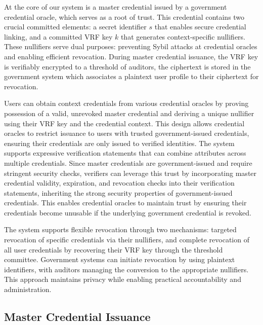 \noindent At the core of our system is a master credential issued by a government credential oracle, which serves as a root of trust. This credential contains two crucial committed elements: a secret identifier $s$ that enables secure credential linking, and a committed VRF key $k$ that generates context-specific nullifiers. These nullifiers serve dual purposes: preventing Sybil attacks at credential oracles and enabling efficient revocation. During master credential issuance, the VRF key is verifiably encrypted to a threshold of auditors, the ciphertext is stored in the government system which associates a plaintext user profile to their ciphertext for revocation.


\noindent Users can obtain context credentials from various credential oracles by proving possession of a valid, unrevoked master credential and deriving a unique nullifier using their VRF key and the credential context. This design allows credential oracles to restrict issuance to users with trusted government-issued credentials, ensuring their credentials are only issued to verified identities. The system supports expressive verification statements that can combine attributes across multiple credentials. Since master credentials are government-issued and require stringent security checks, verifiers can leverage this trust by incorporating master credential validity, expiration, and revocation checks into their verification statements, inheriting the strong security properties of government-issued credentials. This enables credential oracles to maintain trust by ensuring their credentials become unusable if the underlying government credential is revoked.


\noindent The system supports flexible revocation through two mechanisms: targeted revocation of specific credentials via their nullifiers, and complete revocation of all user credentials by recovering their VRF key through the threshold committee. Government systems can initiate revocation by using plaintext identifiers, with auditors managing the conversion to the appropriate nullifiers. This approach maintains privacy while enabling practical accountability and administration.


\subsection{Master Credential Issuance}



